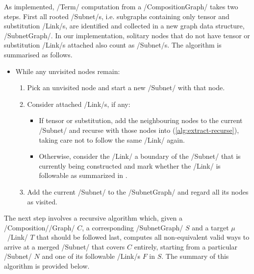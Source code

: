 \documentclass[12pt,a4paper]{article}
\begin{document}
As implemented, \hs/Term/ computation from a \hs/CompositionGraph/ takes two steps. First all rooted \hs/Subnet/s, i.e. subgraphs containing only tensor and substitution \hs/Link/s, are identified and collected in a new graph data structure, \hs/SubnetGraph/. In our implementation, solitary nodes that do not have tensor or substitution \hs/Link/s attached also count as \hs/Subnet/s. The algorithm is summarised as follows.
\begin{itemize}
    \item While any unvisited nodes remain:\begin{enumerate}
        \item Pick an unvisited node and start a new \hs/Subnet/ with that node.
        \item\label{alg:extract-recurse} Consider attached \hs/Link/s, if any:\begin{itemize}
            \item If tensor or substitution, add the neighbouring nodes to the current \hs/Subnet/ and recurse with those nodes into (\ref{alg:extract-recurse}), taking care not to follow the same \hs/Link/ again.
            \item Otherwise, consider the \hs/Link/ a boundary of the \hs/Subnet/ that is currently being constructed and mark whether the \hs/Link/ is followable as summarized in \cite[Fig.~16]{mm12}.
        \end{itemize}
        \item Add the current \hs/Subnet/ to the \hs/SubnetGraph/ and regard all its nodes as visited.
    \end{enumerate}
\end{itemize}
The next step involves a recursive algorithm which, given a \hs/Composition/\-\hs/Graph/ $C$, a corresponding \hs/SubnetGraph/ $S$ and a target $\mu$~\hs/Link/ $T$ that should be followed last, computes all non-equivalent valid ways to arrive at a merged \hs/Subnet/ that covers $C$ entirely, starting from a particular \hs/Subnet/ $N$ and one of its followable \hs/Link/s $F$ in $S$. The summary of this algorithm is provided below.
\end{document}
